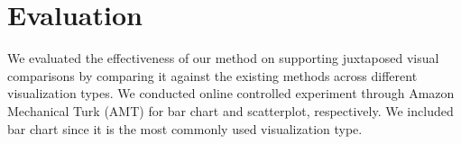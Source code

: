 \section {Evaluation}
\label{sec:results}

We evaluated the effectiveness of our method on supporting juxtaposed visual comparisons by comparing it against the existing methods across different visualization types.
We conducted online controlled experiment through Amazon Mechanical Turk (AMT) for bar chart and scatterplot, respectively.
 We included bar chart since it is the most commonly used visualization type.

